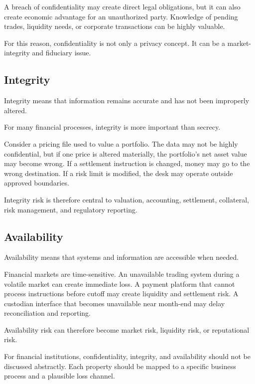 A breach of confidentiality may create direct legal obligations, but it can also create economic advantage for an unauthorized party. Knowledge of pending trades, liquidity needs, or corporate transactions can be highly valuable.

For this reason, confidentiality is not only a privacy concept. It can be a market-integrity and fiduciary issue.

\subsection{Integrity}

Integrity means that information remains accurate and has not been improperly altered.

For many financial processes, integrity is more important than secrecy.

Consider a pricing file used to value a portfolio. The data may not be highly confidential, but if one price is altered materially, the portfolio's net asset value may become wrong. If a settlement instruction is changed, money may go to the wrong destination. If a risk limit is modified, the desk may operate outside approved boundaries.

Integrity risk is therefore central to valuation, accounting, settlement, collateral, risk management, and regulatory reporting.

\subsection{Availability}

Availability means that systems and information are accessible when needed.

Financial markets are time-sensitive. An unavailable trading system during a volatile market can create immediate loss. A payment platform that cannot process instructions before cutoff may create liquidity and settlement risk. A custodian interface that becomes unavailable near month-end may delay reconciliation and reporting.

Availability risk can therefore become market risk, liquidity risk, or reputational risk.

\begin{risklens}
For financial institutions, confidentiality, integrity, and availability should not be discussed abstractly. Each property should be mapped to a specific business process and a plausible loss channel.
\end{risklens}

